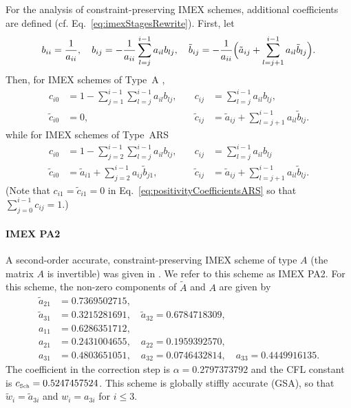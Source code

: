 For the analysis of constraint-preserving IMEX schemes, additional coefficients are defined \cite{hu_etal_2018} (cf. Eq.~\eqref{eq:imexStagesRewrite}).  
First, let
\begin{equation}
  b_{ii} = \frac{1}{a_{ii}}, \quad
  b_{ij} = -\frac{1}{a_{ii}}\sum_{l=j}^{i-1}a_{il}b_{lj}, \quad
  \tilde{b}_{ij} = -\frac{1}{a_{ii}}\Big(\tilde{a}_{ij}+\sum_{l=j+1}^{i-1}a_{il}\tilde{b}_{lj}\Big).  
\end{equation}
Then, for IMEX schemes of Type~A \cite{dimarcoPareschi2013},
\begin{equation}
  \begin{aligned}
    c_{i0} &= 1-\sum_{j=1}^{i-1}\sum_{l=j}^{i-1}a_{il}b_{lj}, \quad &
    c_{ij} &= \sum_{l=j}^{i-1}a_{il}b_{lj}, \\
    \tilde{c}_{i0} &= 0, \quad &
    \tilde{c}_{ij} &= \tilde{a}_{ij} + \sum_{l=j+1}^{i-1}a_{il}\tilde{b}_{lj}.
  \end{aligned}
  \label{eq:positivityCoefficientsA}
\end{equation}
while for IMEX schemes of Type~ARS \cite{ascher_etal_1997}
\begin{equation}
  \begin{aligned}
    c_{i0} &= 1-\sum_{j=2}^{i-1}\sum_{l=j}^{i-1}a_{il}b_{lj}, \quad &
    c_{ij} &= \sum_{l=j}^{i-1}a_{il}b_{lj} \\
    \tilde{c}_{i0} &= \tilde{a}_{i1}+\sum_{j=2}^{i-1}a_{ij}\tilde{b}_{j1}, \quad &
    \tilde{c}_{ij} &= \tilde{a}_{ij}+\sum_{l=j+1}^{i-1}a_{il}\tilde{b}_{lj}.  
  \end{aligned}
  \label{eq:positivityCoefficientsARS}
\end{equation}
(Note that $c_{i1}=\tilde{c}_{i1}=0$ in Eq.~\eqref{eq:positivityCoefficientsARS} so that $\sum_{j=0}^{i-1}c_{ij}=1$.)  

\paragraph{IMEX PA2}

A second-order accurate, constraint-preserving IMEX scheme of type $A$ (the matrix $A$ is invertible) was given in \cite{hu_etal_2018}.  
We refer to this scheme as IMEX PA2.  
For this scheme, the non-zero components of $\tilde{A}$ and $A$ are given by
\begin{align*}
  \tilde{a}_{21} &= 0.7369502715, \\
  \tilde{a}_{31} &= 0.3215281691, \quad \tilde{a}_{32} = 0.6784718309, \\
  a_{11} &= 0.6286351712, \\
  a_{21} &= 0.2431004655, \quad a_{22} = 0.1959392570, \\
  a_{31} &= 0.4803651051, \quad a_{32} = 0.0746432814, \quad a_{33} = 0.4449916135. 
\end{align*}
The coefficient in the correction step is $\alpha = 0.2797373792$ and the CFL constant is $c_{\mbox{\tiny Sch}} = 0.5247457524$.
This scheme is globally stiffly accurate (GSA), so that $\tilde{w}_{i}=\tilde{a}_{3i}$ and $w_{i}=a_{3i}$ for $i\le3$.

